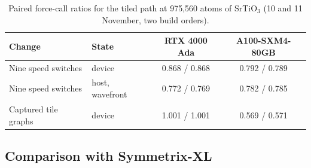 \documentclass[11pt]{article}
\begin{document}
\begin{table}[t]
\centering
\small
\begin{tabular}{llcc}
\toprule
Change & State & RTX 4000 Ada & A100-SXM4-80GB \\
\midrule
Nine speed switches & device              & 0.868 / 0.868 & 0.792 / 0.789 \\
Nine speed switches & host, wavefront     & 0.772 / 0.769 & 0.782 / 0.785 \\
Captured tile graphs & device             & 1.001 / 1.001 & 0.569 / 0.571 \\
\bottomrule
\end{tabular}
\caption{Paired force-call ratios for the tiled path at 975{,}560 atoms of SrTiO$_3$ (10 and 11 November, two
build orders).}
\label{tab:tiledab}
\end{table}

\subsection{Comparison with Symmetrix-XL}
\label{sec:sx}
\end{document}
